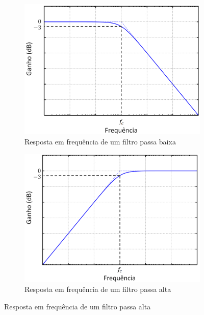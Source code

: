 \begin{enumerate}[i),leftmargin=1.75cm,itemindent=0cm]
	\begin{figure}[!htbp] %
		\centering
		\begin{subfigure}[b]{0.48\textwidth}
			\centering
			\includegraphics[width=\textwidth]{Cap2/Figuras/LP_filter.png}
			\caption{\centering Resposta em frequência de um filtro passa baixa} 
			\label{fig:LP_filter}
		\end{subfigure}%
		\hfill
		\begin{subfigure}[b]{0.48\textwidth}  
			\centering 
			\includegraphics[width=\textwidth]{Cap2/Figuras/HP_filter.png}
			\caption{\centering Resposta em frequência de um filtro passa alta}    
			\label{fig:HP_filter}
		\end{subfigure}%

\end{figure}
\end{enumerate}
